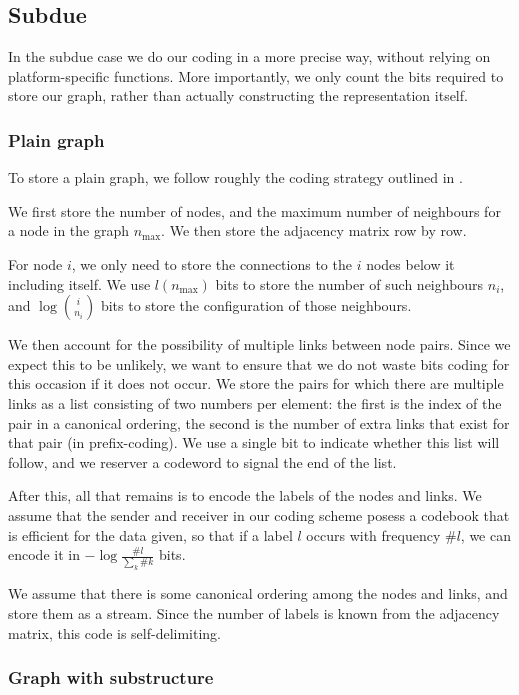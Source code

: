\documentclass{article}
\begin{document}
\subsection*{Subdue}

In the subdue case we do our coding in a more precise way, without relying on platform-specific functions. More importantly, we only count the bits required to store our graph, rather than actually constructing the representation itself.

\subsubsection*{Plain graph}

To store a plain graph, we follow roughly the coding strategy outlined in \cite{holder1994substructure}. 

We first store the number of nodes, and the maximum number of neighbours for a node in the graph $n_{\mbox{max}}$. We then store the adjacency matrix row by row.

For node $i$, we only need to store the connections to the $i$ nodes below it including itself. We use $l(n_{\mbox{max}})$ bits to store the number of such neighbours $n_i$, and $\log{i \choose n_i}$ bits to store the configuration of those neighbours.

We then account for the possibility of multiple links between node pairs. Since we expect this to be unlikely, we want to ensure that we do not waste bits coding for this occasion if it does not occur. We store the pairs for which there are multiple links as a list consisting of two numbers per element: the first is the index of the pair in a canonical ordering, the second is the number of extra links that exist for that pair (in prefix-coding). We use a single bit to indicate whether this list will follow, and we reserver a codeword to signal the end of the list.

After this, all that remains is to encode the labels of the nodes and links. We assume that the sender and receiver in our coding scheme posess a codebook that is efficient for the data given, so that if a label $l$ occurs with frequency $\#l$, we can encode it in $-\log \frac{\#l}{\sum_k \#k}$ bits. 

We assume that there is some canonical ordering among the nodes and links, and store them as a stream. Since the number of labels is known from the adjacency matrix, this code is self-delimiting.

\subsubsection*{Graph with substructure}  
\end{document}
